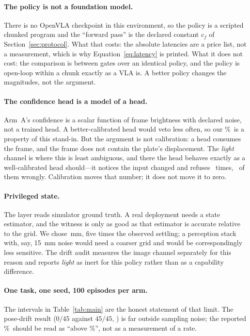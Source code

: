 \documentclass[conference]{IEEEtran}
\theoremstyle{definition}
\begin{document}
\paragraph{The policy is not a foundation model.} There is no OpenVLA checkpoint
in this environment, so the policy is a scripted chunked program and the
``forward pass'' is the declared constant $c_f$ of Section~\ref{sec:protocol}.
What that costs: the absolute latencies are a price list, not a measurement,
which is why Equation~\eqref{eq:latency} is printed. What it does not cost: the
comparison is between gates over an identical policy, and the policy is
open-loop within a chunk exactly as a VLA is. A better policy changes the
magnitudes, not the argument.

\paragraph{The confidence head is a model of a head.} Arm~A's confidence is a
scalar function of frame brightness with declared noise, not a trained head. A
better-calibrated head would veto less often, so our \SafeFalseVetoRate\%\ is a
property of this stand-in. But the argument is not calibration: a head consumes
the frame, and the frame does not contain the plate's displacement. The
\emph{light} channel is where this is least ambiguous, and there the head
behaves exactly as a well-calibrated head should---it notices the input changed
and refuses \SafeVetoesLightDim\ times, \SafeFalseVetoesLightDim\ of them
wrongly. Calibration moves that number; it does not move it to zero.

\paragraph{Privileged state.} The layer reads simulator ground truth. A real
deployment needs a state estimator, and the witness is only as good as that
estimator is accurate relative to the grid. We chose \GridMm\,mm, five times
the observed settling; a perception stack with, say, \SI{15}{mm} noise would
need a coarser grid and would be correspondingly less sensitive. The drift
audit measures the image channel separately for this reason and reports
\emph{light} as inert for this policy rather than as a capability difference.

\paragraph{One task, one seed, 100 episodes per arm.} The intervals in
Table~\ref{tab:main} are the honest statement of that limit. The pose-drift
result ($0/45$ against $45/45$, \PoseP) is far outside sampling noise; the
reported \CELAll\%\ should be read as ``above \CELAllLo\%'', not as a
measurement of a rate.
\end{document}
